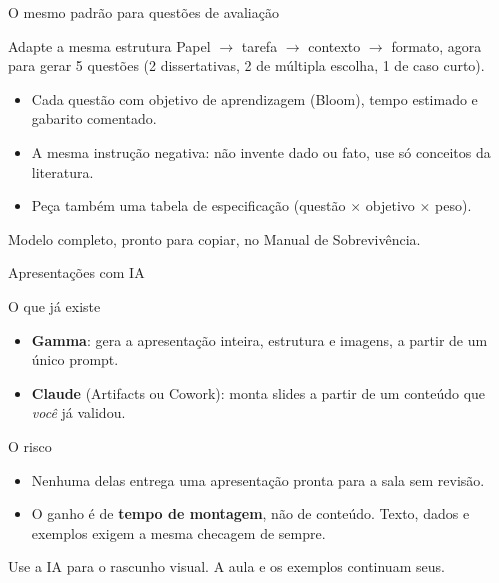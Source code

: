 \documentclass[11pt,aspectratio=169,t]{beamer}
\begin{document}
\begin{frame}{O mesmo padrão para questões de avaliação}
  \begin{block}{Adapte a mesma estrutura}
    \small Papel $\rightarrow$ tarefa $\rightarrow$ contexto $\rightarrow$ formato, agora para gerar 5 questões (2 dissertativas, 2 de múltipla escolha, 1 de caso curto).
  \end{block}
  \vfill
  \begin{itemize}
    \item Cada questão com objetivo de aprendizagem (Bloom), tempo estimado e gabarito comentado.
    \item \alert{A mesma instrução negativa}: não invente dado ou fato, use só conceitos da literatura.
    \item Peça também uma tabela de especificação (questão $\times$ objetivo $\times$ peso).
  \end{itemize}
  \vfill
  \centering\scriptsize Modelo completo, pronto para copiar, no Manual de Sobrevivência.
\end{frame}

\begin{frame}{Apresentações com IA}
  \footnotesize
  \begin{block}{O que já existe}
    \begin{itemize}
      \item \textbf{Gamma}: gera a apresentação inteira, estrutura e imagens, a partir de um único prompt.
      \item \textbf{Claude} (Artifacts ou Cowork): monta slides a partir de um conteúdo que \textit{você} já validou.
    \end{itemize}
  \end{block}
  \pause
  \vspace{0.15cm}
  \begin{alertblock}{O risco}
    \begin{itemize}
      \item Nenhuma delas entrega uma apresentação pronta para a sala sem revisão.
      \item O ganho é de \textbf{tempo de montagem}, não de conteúdo. Texto, dados e exemplos exigem a mesma checagem de sempre.
    \end{itemize}
  \end{alertblock}
  \pause
  \vspace{0.1cm}
  \centering Use a IA para o rascunho visual. A aula e os exemplos continuam seus.
\end{frame}
\end{document}
